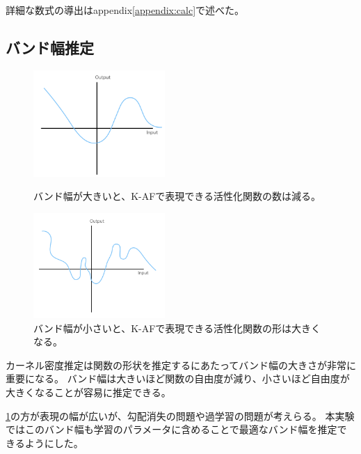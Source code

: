 詳細な数式の導出はappendix\ref{appendix:calc}で述べた。


\subsection{バンド幅推定}


\begin{figure}[hbtp]
    \begin{center}
            \begin{minipage}{0.40\hsize}
                \includegraphics[width=5cm]{asset/k_af_band_big.png}
                    \caption{バンド幅が大きいと、K-AFで表現できる活性化関数の数は減る。}
                    \label{k_af_band_big}
            \end{minipage}
            \begin{minipage}{0.40\hsize}
            \hspace{10pt}
                \includegraphics[width=5cm]{asset/k_af_band_small.png}
                    \caption{バンド幅が小さいと、K-AFで表現できる活性化関数の形は大きくなる。}
                    \label{k_af_band_small}
            \end{minipage}
    \end{center}
\end{figure}


カーネル密度推定は関数の形状を推定するにあたってバンド幅の大きさが非常に重要になる。
バンド幅は大きいほど関数の自由度が減り、小さいほど自由度が大きくなることが容易に推定できる。

\ref{k_af_band_small}の方が表現の幅が広いが、勾配消失の問題や過学習の問題が考えらる。
本実験ではこのバンド幅も学習のパラメータに含めることで最適なバンド幅を推定できるようにした。

